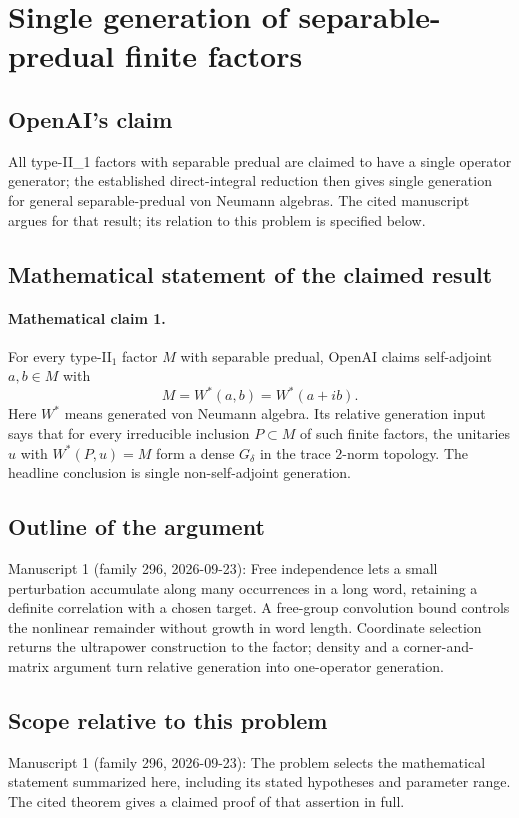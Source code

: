 \documentclass[11pt]{article}
\begin{document}
\section*{Single generation of separable-predual finite factors}

\subsection{OpenAI's claim}
All type-II\_1 factors with separable predual are claimed to have a single operator generator; the established direct-integral reduction then gives single generation for general separable-predual von Neumann algebras. The cited manuscript argues for that result; its relation to this problem is specified below.

\subsection{Mathematical statement of the claimed result}
\paragraph{Mathematical claim 1.} For every type-$\mathrm{II}_1$ factor $M$ with separable predual, OpenAI claims self-adjoint $a,b\in M$ with
\[
M=W^*(a,b)=W^*(a+ib).
\]
Here $W^*$ means generated von Neumann algebra. Its relative generation input says that for every irreducible inclusion $P\subset M$ of such finite factors, the unitaries $u$ with $W^*(P,u)=M$ form a dense $G_\delta$ in the trace $2$-norm topology. The headline conclusion is single non-self-adjoint generation.

\subsection{Outline of the argument}
Manuscript 1 (family 296, 2026-09-23): Free independence lets a small perturbation accumulate along many occurrences in a long word, retaining a definite correlation with a chosen target. A free-group convolution bound controls the nonlinear remainder without growth in word length. Coordinate selection returns the ultrapower construction to the factor; density and a corner-and-matrix argument turn relative generation into one-operator generation.

\subsection{Scope relative to this problem}
Manuscript 1 (family 296, 2026-09-23): The problem selects the mathematical statement summarized here, including its stated hypotheses and parameter range. The cited theorem gives a claimed proof of that assertion in full.
\end{document}
